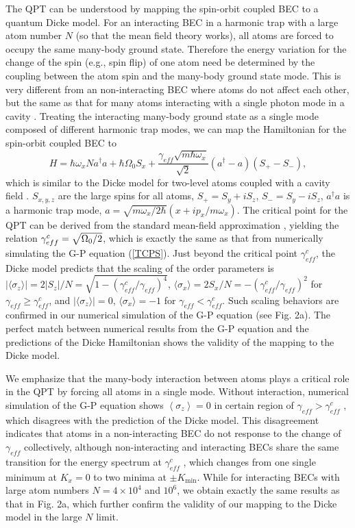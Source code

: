 \documentclass[prl,twocolumn,superscriptaddress,showpacs,floatfix]{revtex4}
\begin{document}
The QPT can be understood by mapping the spin-orbit coupled BEC to a quantum
Dicke model. For an interacting BEC in a harmonic trap with a large atom
number $N$ (so that the mean field theory works), all atoms are forced to
occupy the same many-body ground state. Therefore the energy variation for
the change of the spin (e.g., spin flip) of one atom need be determined by
the coupling between the atom spin and the many-body ground state mode. This
is very different from an non-interacting BEC where atoms do not affect each
other, but the same as that for many atoms interacting with a single photon
mode in a cavity \cite{Dicke}. Treating the interacting many-body ground
state as a single mode composed of different harmonic trap modes, we can
map the Hamiltonian for the spin-orbit coupled BEC to%
\begin{equation}
H=\hbar \omega _{x}Na^{\dagger }a+\hbar \Omega _{0}S_{x}+\frac{\gamma _{eff}%
\sqrt{m\hbar \omega _{x}}}{\sqrt{2}}(a^{\dagger }-a)(S_{+}-S_{-}),
\label{DH}
\end{equation}%
which is similar to the Dicke model for two-level atoms coupled with a
cavity field \cite{Dicke}. $S_{x,y,z}$ are the large spins for all atoms, $%
S_{+}=S_{y}+iS_{z}$, $S_{-}=S_{y}-iS_{z}$, $a^{\dagger }a$ is a harmonic
trap mode, $a=\sqrt{m\omega _{x}/2\hbar }(x+ip_{x}/m\omega _{x})$. The
critical point for the QPT can be derived from the standard mean-field
approximation \cite{Emary}, yielding the relation $\gamma _{eff}^{c}=\sqrt{%
\Omega _{0}/2}$, which is exactly the same as that from numerically
simulating the G-P equation (\ref{TCPS}). Just beyond the critical point $%
\gamma _{eff}^{c}$, the Dicke model predicts that the scaling of the order
parameters is $|\langle \sigma _{z}\rangle |=2|S_{z}|/N=\sqrt{1-(\gamma
_{eff}^{c}/\gamma _{eff})^{4}}$, $\langle \sigma _{x}\rangle
=2S_{x}/N=-(\gamma _{eff}^{c}/\gamma _{eff})^{2}$ for $\gamma _{eff}\geq
\gamma _{eff}^{c}$, and $|\langle \sigma _{z}\rangle |=0$, $\langle \sigma
_{x}\rangle =-1$ for $\gamma _{eff}<\gamma _{eff}^{c}$. Such scaling
behaviors are confirmed in our numerical simulation of the G-P equation (see
Fig. 2a). The perfect match between numerical results from the G-P equation
and the predictions of the Dicke Hamiltonian shows the validity of the
mapping to the Dicke model.

We emphasize that the many-body interaction between atoms plays a critical
role in the QPT by forcing all atoms in a single mode. Without interaction,
numerical simulation of the G-P equation shows $\left\langle \sigma
_{z}\right\rangle =0$ in certain region of $\gamma _{eff}>\gamma _{eff}^{c}$%
, which disagrees with the prediction of the Dicke model. This disagreement
indicates that atoms in a non-interacting BEC do not response to the change
of $\gamma _{eff}$ collectively, although non-interacting and interacting
BECs share the same transition for the energy spectrum at $\gamma _{eff}^{c}$%
, which changes from one single minimum at $K_{x}=0$ to two minima at $\pm
K_{\min }$. While for interacting BECs with large atom numbers $N=4\times
10^{4}$ and $10^{6}$, we obtain exactly the same results as that in Fig. 2a,
which further confirm the validity of our mapping to the Dicke model in the
large $N$ limit.
\end{document}
